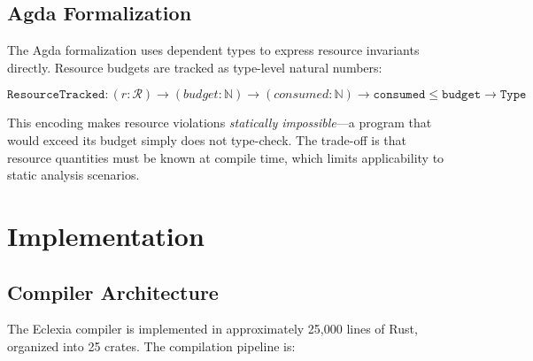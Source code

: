 \documentclass[11pt,a4paper]{article}
\begin{document}
\subsection{Agda Formalization}

The Agda formalization uses dependent types to express resource invariants
directly.  Resource budgets are tracked as type-level natural numbers:

\[
  \mathtt{ResourceTracked} : (r : \mathcal{R}) \to (budget : \mathbb{N})
    \to (consumed : \mathbb{N}) \to \mathtt{consumed} \leq \mathtt{budget}
    \to \mathtt{Type}
\]

This encoding makes resource violations \emph{statically impossible}---a
program that would exceed its budget simply does not type-check.  The trade-off
is that resource quantities must be known at compile time, which limits
applicability to static analysis scenarios.


\section{Implementation}
\label{sec:implementation}

\subsection{Compiler Architecture}

The Eclexia compiler is implemented in approximately 25,000 lines of Rust,
organized into 25 crates.  The compilation pipeline is:

\begin{center}
\end{center}
\end{document}
